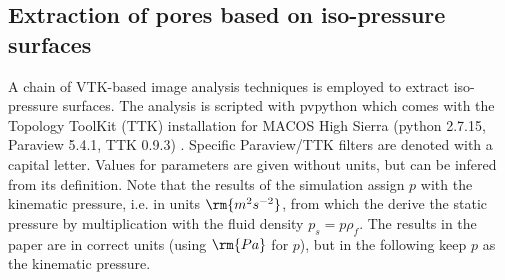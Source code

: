 \documentclass[draft,jgrga]{agutexSI2019}
\begin{document}
\begin{article}
\subsection{Extraction of pores based on iso-pressure surfaces}
A chain of VTK-based image analysis techniques  is employed to extract iso-pressure surfaces. The analysis is scripted with pvpython which comes with the Topology ToolKit (TTK) installation for MACOS High Sierra (python 2.7.15, Paraview 5.4.1, TTK 0.9.3) \cite{tierny_topology_2018}. Specific Paraview/TTK filters are denoted with a capital letter. Values for parameters are given without units, but can be infered from its definition. Note that the results of the simulation assign $p$ with the kinematic pressure, i.e. in units $\rm{m^2s^{-2}}$, from which the derive the static pressure by multiplication with the fluid density $p_s = p\rho_{f}$. The results in the paper are in correct units (using $\rm{Pa}$ for $p$), but in the following keep $p$ as the kinematic pressure. 


\end{article}
\end{document}
